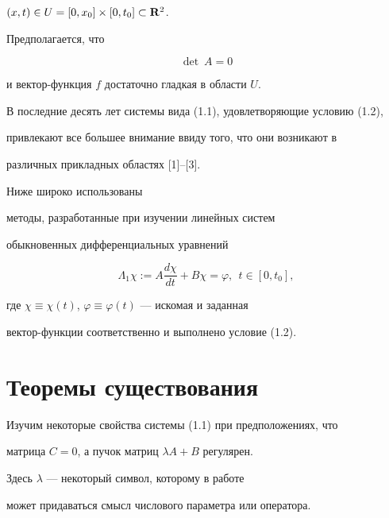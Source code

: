 $(x,t)\in U=[0, x_0]\times [0, t_0]\subset {\bold R}^2$.


Предполагается, что


\begin{equation}


\det\ A=0


\end{equation}


и вектор-функция $f$ достаточно гладкая в области $U$.





В последние десять лет системы вида (1.1), удовлетворяющие условию (1.2),


привлекают все большее внимание ввиду того, что они возникают в


различных прикладных областях [1]--[3].





Ниже широко использованы


методы, разработанные при изучении линейных систем


обыкновенных дифференциальных уравнений


\begin{equation}


\Lambda _{1}\chi:=A\frac{d\chi}{dt}+B\chi =\varphi,\ \ t\in [0,t_0],


\end{equation}


где $\chi\equiv \chi (t)$, $\varphi \equiv \varphi (t)$ --- искомая и заданная


вектор-функции соответственно и выполнено условие (1.2).








\section{Теоремы существования}





Изучим некоторые свойства системы (1.1) при предположениях, что


матрица $C=0$, а пучок матриц $\lambda A+B$ регулярен.


Здесь $\lambda$ --- некоторый символ, которому в работе


может придаваться смысл числового параметра или оператора.





